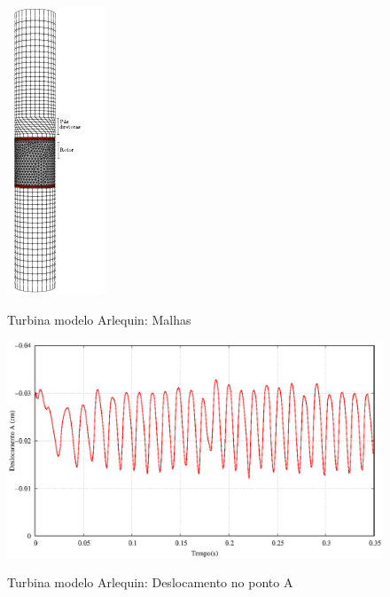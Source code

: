 \begin{figure}[!htbp]
	\caption{Turbina modelo Arlequin: Malhas}
	\centering 
	\includegraphics[scale=2.0,trim=0cm 0cm 0cm 0cm, clip=true]{Imagens/Cap7/turbina_arlq_malha.pdf}	
	\label{fig:turbina_arlq_malha}
\end{figure}


\begin{figure}[!htbp]
	\caption{Turbina modelo Arlequin: Deslocamento no ponto A}
	\centering 
	\includegraphics[scale=0.6,trim=0cm 0cm 0cm 0cm, clip=true]{Imagens/Cap7/turbina_arlq_deslocamento.eps}	
	\label{fig:turbina_arlq_deslA}
\end{figure}

